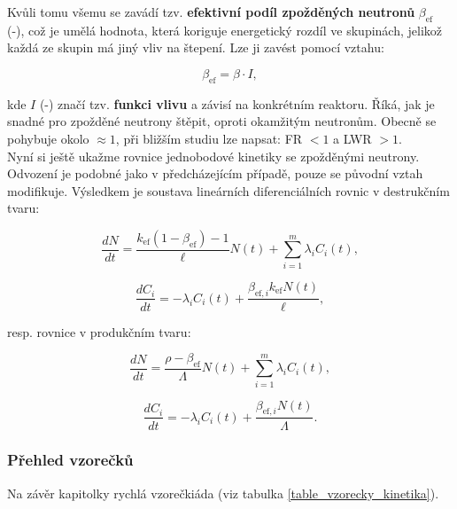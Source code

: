 Kvůli tomu všemu se zavádí tzv. \textbf{efektivní podíl zpožděných neutronů} $\beta_{\text{ef}}$ (-), což je umělá hodnota, která koriguje energetický rozdíl ve skupinách, jelikož každá ze skupin má jiný vliv na štepení. Lze ji zavést pomocí vztahu:

\begin{equation}
  \beta_{\text{ef}} = \beta \cdot I,
\end{equation}

kde $I$ (-) značí tzv. \textbf{funkci vlivu} a závisí na konkrétním reaktoru. Říká, jak je snadné pro zpožděné neutrony štěpit, oproti okamžitým neutronům. Obecně se pohybuje okolo $\approx 1$, při bližším studiu lze napsat: FR $<1$ a LWR $>1$.\\

Nyní si ještě ukažme rovnice jednobodové kinetiky se zpožděnými neutrony. Odvození je podobné jako v předcházejícím případě, pouze se původní vztah modifikuje. Výsledkem je soustava lineárních diferenciálních rovnic v destrukčním tvaru:

\begin{equation}
  \boxed{
  \dfrac{dN}{dt} = \dfrac{k_{\text{ef}}(1-\beta_{\text{ef}})-1}{\ell} N(t) + \sum_{i=1}^m \lambda_i C_i(t),
  \label{rovnice_kinetiky_zpozdenky_1}}
\end{equation}

\begin{equation}
  \boxed{
  \dfrac{dC_i}{dt} = -\lambda_i C_i(t) + \dfrac{\beta_{\text{ef},i} k_{\text{ef}} N(t)}{\ell},
  \label{rovnice_kinetiky_zpozdenky_2}}
\end{equation}

resp. rovnice v produkčním tvaru:

\begin{equation}
  \boxed{
  \dfrac{dN}{dt} = \dfrac{\rho - \beta_{\text{ef}}}{\Lambda} N(t) + \sum_{i=1}^m \lambda_i C_i(t),
  \label{rovnice_kinetiky_zpozdenky_3}}
\end{equation}

\begin{equation}
  \boxed{
  \dfrac{dC_i}{dt} = -\lambda_i C_i(t) + \dfrac{\beta_{\text{ef},i}  N(t)}{\Lambda}.
  \label{rovnice_kinetiky_zpozdenky_4}}
\end{equation}

\subsubsection{Přehled vzorečků}

Na závěr kapitolky rychlá vzorečkiáda (viz tabulka \ref{table_vzorecky_kinetika}).

